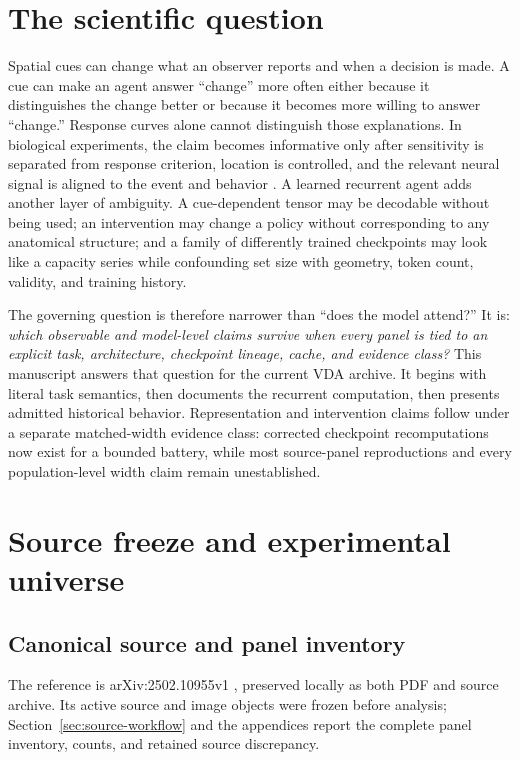 \documentclass[11pt,a4paper]{article}
\begin{document}
\section{The scientific question}
Spatial cues can change what an observer reports and when a decision is made. A cue can make an agent answer ``change'' more often either because it distinguishes the change better or because it becomes more willing to answer ``change.'' Response curves alone cannot distinguish those explanations. In biological experiments, the claim becomes informative only after sensitivity is separated from response criterion, location is controlled, and the relevant neural signal is aligned to the event and behavior \cite{carrasco2011,herman2017,luo2018}. A learned recurrent agent adds another layer of ambiguity. A cue-dependent tensor may be decodable without being used; an intervention may change a policy without corresponding to any anatomical structure; and a family of differently trained checkpoints may look like a capacity series while confounding set size with geometry, token count, validity, and training history.

The governing question is therefore narrower than ``does the model attend?'' It is: \emph{which observable and model-level claims survive when every panel is tied to an explicit task, architecture, checkpoint lineage, cache, and evidence class?} This manuscript answers that question for the current VDA archive. It begins with literal task semantics, then documents the recurrent computation, then presents admitted historical behavior. Representation and intervention claims follow under a separate matched-width evidence class: corrected checkpoint recomputations now exist for a bounded battery, while most source-panel reproductions and every population-level width claim remain unestablished.

\section{Source freeze and experimental universe}
\subsection{Canonical source and panel inventory}
The reference is arXiv:2502.10955v1 \cite{mah2025}, preserved locally as both PDF and source archive. Its active source and image objects were frozen before analysis; Section~\ref{sec:source-workflow} and the appendices report the complete panel inventory, counts, and retained source discrepancy.
\end{document}
